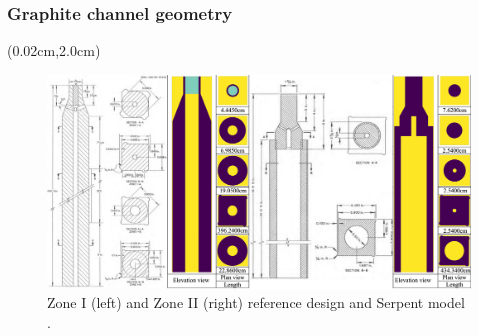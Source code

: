 \begin{frame}
\frametitle{Graphite channel geometry}
\begin{textblock*}{12.5cm}(0.02cm,2.0cm) %
\begin{figure}[t]
\includegraphics[width=1.02\textwidth]{./images/detailed_element_xz.png}
\vspace{-5mm}
\caption{Zone I (left) and Zone II (right) reference design 
\cite{robertson_conceptual_1971} and Serpent 
model \cite{rykhlevskii_full-core_2017}.}
\end{figure}
\end{textblock*}

\end{frame}


